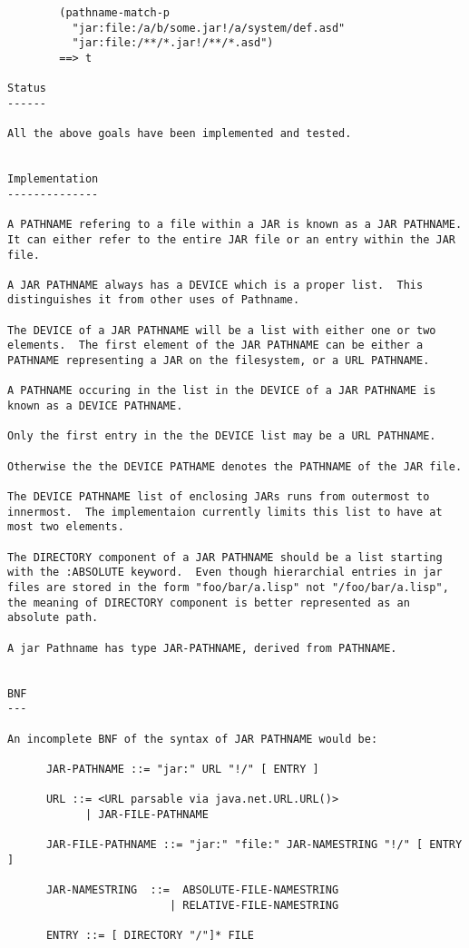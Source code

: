 \begin{verbatim}
        (pathname-match-p 
          "jar:file:/a/b/some.jar!/a/system/def.asd"
          "jar:file:/**/*.jar!/**/*.asd")      
        ==> t

Status
------

All the above goals have been implemented and tested.


Implementation
--------------

A PATHNAME refering to a file within a JAR is known as a JAR PATHNAME.
It can either refer to the entire JAR file or an entry within the JAR
file.

A JAR PATHNAME always has a DEVICE which is a proper list.  This
distinguishes it from other uses of Pathname.

The DEVICE of a JAR PATHNAME will be a list with either one or two
elements.  The first element of the JAR PATHNAME can be either a
PATHNAME representing a JAR on the filesystem, or a URL PATHNAME.

A PATHNAME occuring in the list in the DEVICE of a JAR PATHNAME is
known as a DEVICE PATHNAME.

Only the first entry in the the DEVICE list may be a URL PATHNAME.

Otherwise the the DEVICE PATHAME denotes the PATHNAME of the JAR file.

The DEVICE PATHNAME list of enclosing JARs runs from outermost to
innermost.  The implementaion currently limits this list to have at
most two elements.
    
The DIRECTORY component of a JAR PATHNAME should be a list starting
with the :ABSOLUTE keyword.  Even though hierarchial entries in jar
files are stored in the form "foo/bar/a.lisp" not "/foo/bar/a.lisp",
the meaning of DIRECTORY component is better represented as an
absolute path.

A jar Pathname has type JAR-PATHNAME, derived from PATHNAME.


BNF
---

An incomplete BNF of the syntax of JAR PATHNAME would be:

      JAR-PATHNAME ::= "jar:" URL "!/" [ ENTRY ]

      URL ::= <URL parsable via java.net.URL.URL()>
            | JAR-FILE-PATHNAME

      JAR-FILE-PATHNAME ::= "jar:" "file:" JAR-NAMESTRING "!/" [ ENTRY ]

      JAR-NAMESTRING  ::=  ABSOLUTE-FILE-NAMESTRING
                         | RELATIVE-FILE-NAMESTRING

      ENTRY ::= [ DIRECTORY "/"]* FILE



\end{verbatim}
